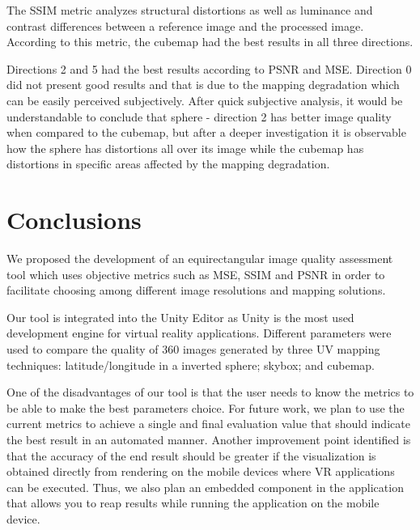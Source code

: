 \documentclass[12pt]{article}
\begin{document}
The SSIM metric analyzes structural distortions as well as luminance and contrast differences between a reference image and the processed image. According to this metric, the cubemap had the best results in all three directions.

Directions 2 and 5 had the best results according to PSNR and MSE. Direction 0 did not present good results and that is due to the mapping degradation which can be easily perceived subjectively. After quick subjective analysis, it would be understandable to conclude that sphere - direction 2 has better image quality when compared to the cubemap, but after a deeper investigation it is observable how the sphere has distortions all over its image while the cubemap has distortions in specific areas affected by the mapping degradation.

\section{Conclusions}
We proposed the development of an equirectangular image quality assessment tool which uses objective metrics such as MSE, SSIM and PSNR in order to facilitate choosing among different image resolutions and mapping solutions.

Our tool is integrated into the Unity Editor as Unity is the most used development engine for virtual reality applications. Different parameters were used to compare the quality of 360 images generated by three UV mapping techniques:  latitude/longitude in a inverted sphere; skybox; and cubemap.

One of the disadvantages of our tool is that the user needs to know the metrics to be able to make the best parameters choice. For future work, we plan to use the current metrics to achieve a single and final evaluation value that should indicate the best result in an automated manner. Another improvement point identified is that the accuracy of the end result should be greater if the visualization is obtained directly from rendering on the mobile devices where VR applications can be executed. Thus, we also plan an embedded component in the application that allows you to reap results while running the application on the mobile device.



\end{document}
